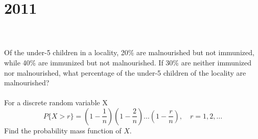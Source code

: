 \section*{2011}
\vspace{-.5cm}
\hrulefill \\\\
 Of the under-5 children in a locality, 20\% are malnourished but not immunized, while 40\% are immunized but not malnourished. If 30\% are neither immunized nor malnourished, what percentage of the under-5 children of the locality are malnourished?
\\\\
 For a discrete random variable X
\begin{equation*}
    P\{X>r\} = \left(1 - \frac{1}{n}\right) \left(1 - \frac{2}{n}\right)\dots \left(1 - \frac{r}{n}\right), \quad r=1,2,\dots
\end{equation*}
Find the probability mass function of $X$.